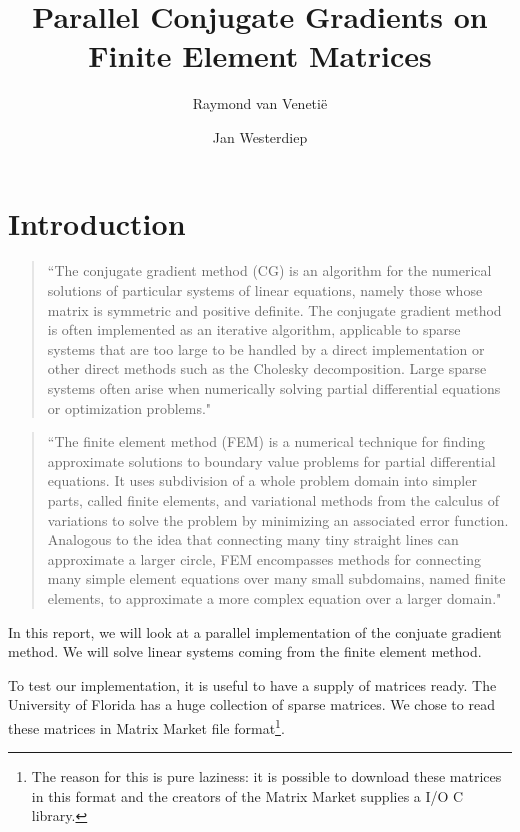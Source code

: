 \documentclass[11pt]{amsart}
\theoremstyle{definition}
\begin{document}
\title{Parallel Conjugate Gradients on Finite Element Matrices}
\author{Raymond van Veneti\"e \and Jan Westerdiep}
\maketitle

\section{Introduction}
\begin{quote}
``The conjugate gradient method (CG) is an algorithm for the numerical solutions of particular systems of linear equations, namely those whose matrix is symmetric and positive definite. The conjugate gradient method is often implemented as an iterative algorithm, applicable to sparse systems that are too large to be handled by a direct implementation or other direct methods such as the Cholesky decomposition. Large sparse systems often arise when numerically solving partial differential equations or optimization problems." \cite{wiki:cg}
\end{quote}

\begin{quote}
``The finite element method (FEM) is a numerical technique for finding approximate solutions to boundary value problems for partial differential equations. It uses subdivision of a whole problem domain into simpler parts, called finite elements, and variational methods from the calculus of variations to solve the problem by minimizing an associated error function. Analogous to the idea that connecting many tiny straight lines can approximate a larger circle, FEM encompasses methods for connecting many simple element equations over many small subdomains, named finite elements, to approximate a more complex equation over a larger domain." \cite{wiki:fem}
\end{quote}

In this report, we will look at a parallel implementation of the conjuate gradient method. We will solve linear systems coming from the finite element method.

To test our implementation, it is useful to have a supply of matrices ready. The University of Florida has a huge collection of sparse matrices. \cite{uniflo} We chose to read these matrices in Matrix Market file format\footnote{The reason for this is pure laziness: it is possible to download these matrices in this format and the creators of the Matrix Market supplies a I/O C library.}. \cite{matmar}
\end{document}
